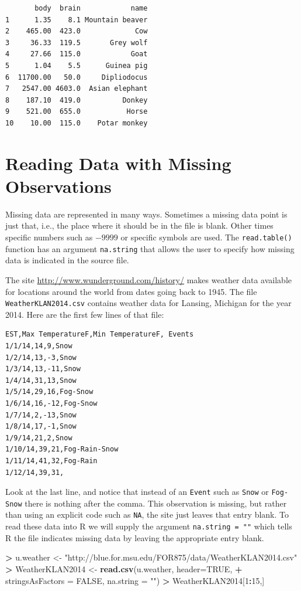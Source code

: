\documentclass[]{krantz}
\makeatletter
\newenvironment{Shaded}{\begin{snugshade}}{\end{snugshade}}
\newcommand{\KeywordTok}[1]{\textcolor[rgb]{0.27,0.27,0.27}{\textbf{#1}}}
\newcommand{\DataTypeTok}[1]{\textcolor[rgb]{0.27,0.27,0.27}{#1}}
\newcommand{\DecValTok}[1]{\textcolor[rgb]{0.06,0.06,0.06}{#1}}
\newcommand{\StringTok}[1]{\textcolor[rgb]{0.5,0.5,0.5}{#1}}
\newcommand{\OtherTok}[1]{\textcolor[rgb]{0.37,0.37,0.37}{#1}}
\newcommand{\OperatorTok}[1]{\textcolor[rgb]{0.43,0.43,0.43}{\textbf{#1}}}
\newcommand{\NormalTok}[1]{#1}
\newenvironment{kframe}{%
\medskip{}
\setlength{\fboxsep}{.8em}
 \def\at@end@of@kframe{}%
 \ifinner\ifhmode%
  \def\at@end@of@kframe{\end{minipage}}%
  \begin{minipage}{\columnwidth}%
 \fi\fi%
 \def\FrameCommand##1{\hskip\@totalleftmargin \hskip-\fboxsep
 \colorbox{shadecolor}{##1}\hskip-\fboxsep
     \hskip-\linewidth \hskip-\@totalleftmargin \hskip\columnwidth}%
 \MakeFramed {\advance\hsize-\width
   \@totalleftmargin\z@ \linewidth\hsize
   \@setminipage}}%
 {\par\unskip\endMakeFramed%
 \at@end@of@kframe}
\renewenvironment{Shaded}{\begin{kframe}}{\end{kframe}}
\makeatother
\begin{document}
\begin{verbatim}
       body  brain            name
1      1.35    8.1 Mountain beaver
2    465.00  423.0             Cow
3     36.33  119.5       Grey wolf
4     27.66  115.0            Goat
5      1.04    5.5      Guinea pig
6  11700.00   50.0     Dipliodocus
7   2547.00 4603.0  Asian elephant
8    187.10  419.0          Donkey
9    521.00  655.0           Horse
10    10.00  115.0    Potar monkey
\end{verbatim}

\section{Reading Data with Missing
Observations}\label{reading-data-with-missing-observations}

Missing data are represented in many ways. Sometimes a missing data
point is just that, i.e., the place where it should be in the file is
blank. Other times specific numbers such as \(-9999\) or specific
symbols are used. The \texttt{read.table()} function has an argument
\texttt{na.string} that allows the user to specify how missing data is
indicated in the source file.

The site \url{http://www.wunderground.com/history/} makes weather data
available for locations around the world from dates going back to 1945.
The file \texttt{WeatherKLAN2014.csv} contains weather data for Lansing,
Michigan for the year 2014. Here are the first few lines of that file:

\begin{verbatim}
EST,Max TemperatureF,Min TemperatureF, Events
1/1/14,14,9,Snow
1/2/14,13,-3,Snow
1/3/14,13,-11,Snow
1/4/14,31,13,Snow
1/5/14,29,16,Fog-Snow
1/6/14,16,-12,Fog-Snow
1/7/14,2,-13,Snow
1/8/14,17,-1,Snow
1/9/14,21,2,Snow
1/10/14,39,21,Fog-Rain-Snow
1/11/14,41,32,Fog-Rain
1/12/14,39,31,
\end{verbatim}

Look at the last line, and notice that instead of an \texttt{Event} such
as \texttt{Snow} or \texttt{Fog-Snow} there is nothing after the comma.
This observation is missing, but rather than using an explicit code such
as \texttt{NA}, the site just leaves that entry blank. To read these
data into R we will supply the argument \texttt{na.string\ =\ ""} which
tells R the file indicates missing data by leaving the appropriate entry
blank.

\begin{Shaded}
\begin{Highlighting}[]
\OperatorTok{>}\StringTok{ }\NormalTok{u.weather <-}\StringTok{ "http://blue.for.msu.edu/FOR875/data/WeatherKLAN2014.csv"}
\OperatorTok{>}\StringTok{ }\NormalTok{WeatherKLAN2014 <-}\StringTok{ }\KeywordTok{read.csv}\NormalTok{(u.weather, }\DataTypeTok{header=}\OtherTok{TRUE}\NormalTok{, }
\OperatorTok{+}\StringTok{                             }\DataTypeTok{stringsAsFactors =} \OtherTok{FALSE}\NormalTok{, }\DataTypeTok{na.string =} \StringTok{""}\NormalTok{)}
\OperatorTok{>}\StringTok{ }\NormalTok{WeatherKLAN2014[}\DecValTok{1}\OperatorTok{:}\DecValTok{15}\NormalTok{,]}
\end{Highlighting}
\end{Shaded}
\end{document}
